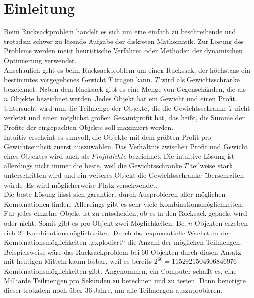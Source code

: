 
\chapter{Einleitung}
Beim Rucksackproblem handelt es sich um eine einfach zu beschreibende und trotzdem schwer zu lösende Aufgabe der diskreten Mathematik.
Zur Lösung des Problems werden meist heuristische Verfahren oder Methoden der dynamischen Optimierung verwendet. \cite[vgl.][]{Luderer2017} \\
Anschaulich geht es beim Rucksackproblem um einen Rucksack, der höchstens ein bestimmtes vorgegebenes Gewicht $T$ tragen kann. 
$T$ wird als Gewichtsschranke bezeichnet.
Neben dem Rucksack gibt es eine Menge von Gegenschänden, die als $n$ Objekte bezeichnet werden. 
Jedes Objekt hat ein Gewicht und einen Profit. 
Untersucht wird nun die Teilmenge der Objekte, die die Gewichtsschranke $T$ nicht verletzt und einen möglichst großen Gesamtprofit hat, 
das heißt, die Summe der Profite der eingepackten Objekte soll maximiert werden. \\
Intuitiv erscheint es sinnvoll, die Objekte mit dem größten Profit pro Gewichtseinheit zuerst auszuwählen.
Das Verhältnis zwischen Profit und Gewicht eines Objektes wird auch als \textit{Profitdichte} bezeichnet. 
Die intuitive Lösung ist allerdings nicht immer die beste, weil die Gewichtsschranke $T$ teilweise stark unterschritten wird und ein weiteres Objekt die Gewichtsschranke überschreiten würde.
Es wird möglicherweise Platz verschwendet.\\
Die beste Lösung lässt sich garantiert durch Ausprobieren aller möglichen Kombinationen finden.
Allerdings gibt es sehr viele Kombinationsmöglichkeiten.
Für jedes einzelne Objekt ist zu entscheiden, ob es in den Rucksack gepackt wird oder nicht. Somit gibt es pro Objekt zwei Möglichkeiten.
Bei $n$ Objekten ergeben sich $2^n$ Kombinationsmöglichkeiten. Durch das exponentielle Wachstum der Kombinationsmöglichkeiten „explodiert“ die Anzahl der möglichen Teilmengen. Beispielsweise wäre das Rucksackproblem bei 60 Objekten durch diesen Ansatz mit heutigen Mitteln kaum lösbar, weil es bereits $2^{60} = 1  152 921 504 606 846 976$ Kombinationsmöglichkeiten gibt. Angenommen, ein Computer schafft es, eine Milliarde Teilmengen pro Sekunden zu berechnen und zu testen. Dann benötigte dieser trotzdem noch über 36 Jahre, um alle Teilmengen auszuprobieren. \cite[vgl.][]{Vocking2008} \\


